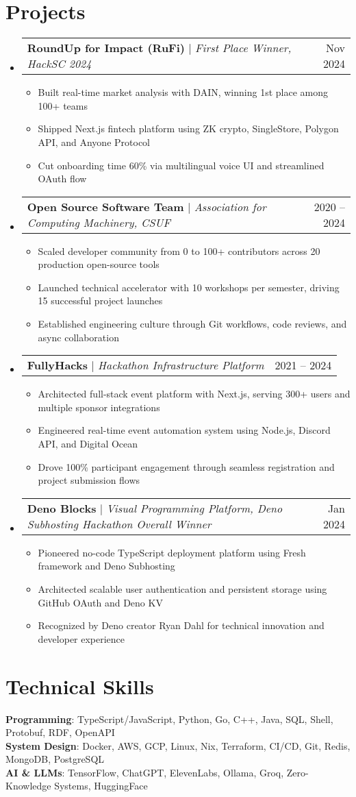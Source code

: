 \documentclass[letterpaper,12pt]{article}
\makeatletter
\newcommand{\resumeItem}[1]{
  \item\small{
    {#1 \vspace{-2pt}}
  }
}
\newcommand{\resumeProjectHeading}[2]{
    \item
    \begin{tabular*}{0.97\textwidth}{l@{\extracolsep{\fill}}r}
      \small#1 & #2 \\
    \end{tabular*}\vspace{-7pt}
}
\newcommand{\resumeSubHeadingListStart}{\begin{itemize}[leftmargin=0.15in, label={}]}
\newcommand{\resumeSubHeadingListEnd}{\end{itemize}}
\newcommand{\resumeItemListStart}{\begin{itemize}}
\newcommand{\resumeItemListEnd}{\end{itemize}\vspace{-5pt}}
\makeatother
\begin{document}
\section{Projects}
\resumeSubHeadingListStart
  \resumeProjectHeading
    {\textbf{RoundUp for Impact (RuFi)} $|$ \emph{First Place Winner, HackSC 2024}}{Nov 2024}
    \resumeItemListStart
      \resumeItem{Built real-time market analysis with DAIN, winning 1st place among 100+ teams}
      \resumeItem{Shipped Next.js fintech platform using ZK crypto, SingleStore, Polygon API, and Anyone Protocol}
      \resumeItem{Cut onboarding time 60\% via multilingual voice UI and streamlined OAuth flow}
    \resumeItemListEnd

  \resumeProjectHeading
    {\textbf{Open Source Software Team} $|$ \emph{Association for Computing Machinery, CSUF}}{2020 -- 2024}
    \resumeItemListStart
      \resumeItem{Scaled developer community from 0 to 100+ contributors across 20 production open-source tools}
      \resumeItem{Launched technical accelerator with 10 workshops per semester, driving 15 successful project launches}
      \resumeItem{Established engineering culture through Git workflows, code reviews, and async collaboration}
    \resumeItemListEnd

  \resumeProjectHeading
    {\textbf{FullyHacks} $|$ \emph{Hackathon Infrastructure Platform}}{2021 -- 2024}
    \resumeItemListStart
      \resumeItem{Architected full-stack event platform with Next.js, serving 300+ users and multiple sponsor integrations}
      \resumeItem{Engineered real-time event automation system using Node.js, Discord API, and Digital Ocean}
      \resumeItem{Drove 100\% participant engagement through seamless registration and project submission flows}
    \resumeItemListEnd

  \resumeProjectHeading
    {\textbf{Deno Blocks} $|$ \emph{Visual Programming Platform, Deno Subhosting Hackathon Overall Winner}}{Jan 2024}
    \resumeItemListStart
      \resumeItem{Pioneered no-code TypeScript deployment platform using Fresh framework and Deno Subhosting}
      \resumeItem{Architected scalable user authentication and persistent storage using GitHub OAuth and Deno KV}
      \resumeItem{Recognized by Deno creator Ryan Dahl for technical innovation and developer experience}
    \resumeItemListEnd
  \resumeSubHeadingListEnd


\section{Technical Skills}
\begin{itemize}[leftmargin=0.15in, label={}]
      \small{\item{
    \textbf{Programming}{: TypeScript/JavaScript, Python, Go, C++, Java, SQL, Shell, Protobuf, RDF, OpenAPI} \\
    \textbf{System Design}{: Docker, AWS, GCP, Linux, Nix, Terraform, CI/CD, Git, Redis, MongoDB, PostgreSQL} \\
    \textbf{AI \& LLMs}{: TensorFlow, ChatGPT, ElevenLabs, Ollama, Groq, Zero-Knowledge Systems, HuggingFace}
    }}
 \end{itemize}


\end{document}
